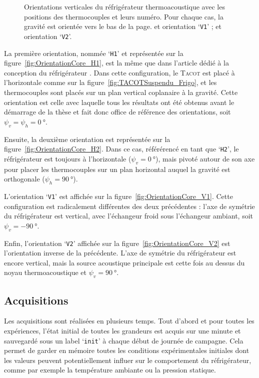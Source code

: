 \begin{figure}[!tb]
\begin{subfigure}[c]{.4\textwidth}
		\caption{}
		\label{fig:OrientationCore_V2_Schema}
	\end{subfigure} 	
 	\caption{Orientations verticales du réfrigérateur thermoacoustique avec les positions des thermocouples et leurs numéro. Pour chaque cas, la gravité est orientée vers le bas de la page.  et  orientation `\texttt{V1}' ;  et  orientation  `\texttt{V2}'.}%
    \label{fig:OrientationCore_V} %
\end{figure}



La première orientation, nommée `\texttt{H1}' et représentée sur la figure~\ref{fig:OrientationCore_H1}, est la même que dans l'article dédié à la conception du réfrigérateur \cite{ramadan_design_2021}. Dans cette configuration, le \textsc{Tacot} est placé à l'horizontale comme sur la figure~\ref{fig:TACOTSuspendu_Frigo}, et les thermocouples sont placés sur un plan vertical coplanaire à la gravité. Cette orientation est celle avec laquelle tous les résultats ont été obtenus avant le démarrage de la thèse et fait donc office de référence des orientations, soit $\psi_v=\psi_h=\qty{0}{\degree}$.\smallskip

Ensuite, la deuxième orientation est représentée sur la figure~\ref{fig:OrientationCore_H2}. Dans ce cas, référérencé en tant que `\texttt{H2}', le réfrigérateur est toujours à l'horizontale ($\psi_v=\qty{0}{\degree}$), mais pivoté autour de son axe pour placer les thermocouples sur un plan horizontal auquel la gravité est orthogonale ($\psi_h=\qty{90}{\degree}$).\smallskip

L'orientation `\texttt{V1}' est affichée sur la figure~\ref{fig:OrientationCore_V1}. Cette configuration est radicalement différentes des deux précédentes : l'axe de symétrie du réfrigérateur est vertical, avec l'échangeur froid sous l'échangeur ambiant, soit $\psi_v=\qty{-90}{\degree}$. \smallskip

Enfin, l'orientation `\texttt{V2}' affichée sur la figure~\ref{fig:OrientationCore_V2} est l'orientation inverse de la précédente. L'axe de symétrie du réfrigérateur est encore vertical, mais la source acoustique principale est cette fois au dessus du noyau thermoacoustique et $\psi_v=\qty{+90}{\degree}$.

\subsection{Acquisitions}
Les acquisitions sont réalisées en plusieurs temps. Tout d'abord et pour toutes les expériences,  l'état initial de toutes les grandeurs est acquis sur une minute et sauvegardé sous un label `\texttt{init}' à chaque début de journée de campagne. Cela permet de garder en mémoire toutes les conditions expérimentales initiales dont les valeurs peuvent potentiellement influer sur le comportement du réfrigérateur, comme par exemple la température ambiante ou la pression statique. \medskip

